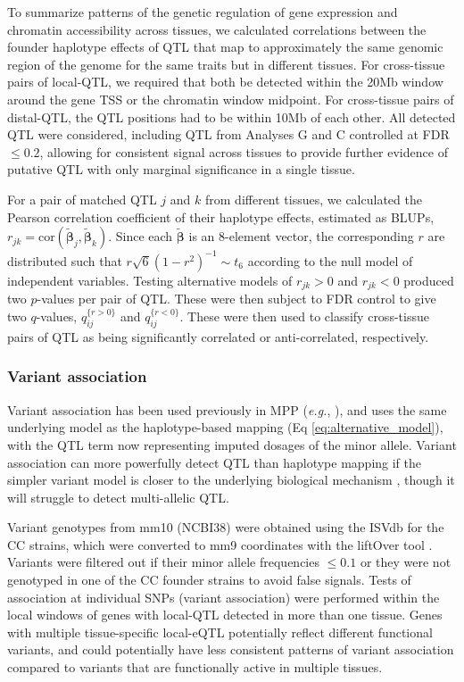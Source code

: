 \documentclass[10pt,letterpaper]{article}
\newcommand{\eg}{\emph{e.g.}\xspace}
\newcommand{\bbeta}{\boldsymbol{\beta}}
\newcommand{\blup}{\widetilde{\bbeta}}
\begin{document}
To summarize patterns of the genetic regulation of gene expression and chromatin accessibility across tissues, we calculated correlations between the founder haplotype effects of QTL that map to approximately the same genomic region of the genome for the same traits but in different tissues. For cross-tissue pairs of local-QTL, we required that both be detected within the 20Mb window around the gene TSS or the chromatin window midpoint. For cross-tissue pairs of distal-QTL, the QTL positions had to be within 10Mb of each other. All detected QTL were considered, including QTL from Analyses G and C controlled at FDR $\le 0.2$, allowing for consistent signal across tissues to provide further evidence of putative QTL with only marginal significance in a single tissue.

For a pair of matched QTL $j$ and $k$ from different tissues, we calculated the Pearson correlation coefficient of their haplotype effects, estimated as BLUPs, $r_{jk} = \text{cor}(\blup_j, \blup_k)$. Since each $\blup$ is an 8-element vector, the corresponding $r$ are distributed such that $r\sqrt{6}(1 - r^{2})^{-1} \sim t_{6}$ according to the null model of independent variables. Testing alternative models of $r_{jk} > 0$ and $r_{jk} < 0$ produced two $p$-values per pair of QTL. These were then subject to FDR control \cite{Benjamini1995} to give two $q$-values, $q_{ij}^{\{r > 0\}}$ and $q_{ij}^{\{r < 0\}}$. These were then used to classify cross-tissue pairs of QTL as being significantly correlated or anti-correlated, respectively. 

\subsubsection*{Variant association}

Variant association has been used previously in MPP (\eg, \cite{Baud2014, Keele2018}), and uses the same underlying model as the haplotype-based mapping (Eq \ref{eq:alternative_model}), with the QTL term now representing imputed dosages of the minor allele. Variant association can more powerfully detect QTL than haplotype mapping if the simpler variant model is closer to the underlying biological mechanism \cite{Yalcin2005}, though it will struggle to detect multi-allelic QTL.

Variant genotypes from mm10 (NCBI38) were obtained using the ISVdb \cite{Oreper2017} for the CC strains, which were converted to mm9 coordinates with the liftOver tool \cite{Lawrence2009}. Variants were filtered out if their minor allele frequencies $\le 0.1$ or they were not genotyped in one of the CC founder strains to avoid false signals.
Tests of association at individual SNPs (variant association) were performed within the local windows of genes with local-QTL detected in more than one tissue. 
Genes with multiple tissue-specific local-eQTL potentially reflect different functional variants, and could potentially have less consistent patterns of variant association compared to variants that are functionally active in multiple tissues.
\end{document}
